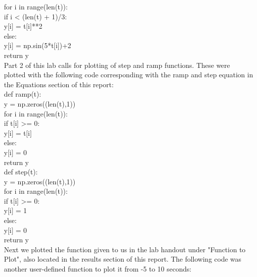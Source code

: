 \documentclass[12pt]{report}
\begin{document}
    \indent \indent for i in range(len(t)):\\
        \indent \indent \indent if i < (len(t) + 1)/3:\\ %
          \indent \indent  \indent \indent y[i] = t[i]**2\\
       \indent \indent \indent else:\\
           \indent \indent \indent \indent y[i] = np.sin(5*t[i])+2\\
    \indent \indent return y \\
    

\noindent Part 2 of this lab calls for plotting of step and ramp functions. These were plotted with the following code corresponding with the ramp and step equation in the Equations section of this report: \\

\indent def ramp(t):\\
    \indent \indent y = np.zeros((len(t),1))\\
    
    \indent \indent for i in range(len(t)):\\
        \indent \indent \indent if t[i] >= 0:\\
            \indent \indent \indent \indent y[i] = t[i]\\
        \indent \indent \indent else: \\
            \indent \indent \indent \indent y[i] = 0\\
    \indent \indent return y\\
    
\indent def step(t):\\
    \indent \indent y = np.zeros((len(t),1))\\
    
    \indent \indent for i in range(len(t)):\\
        \indent \indent \indent if t[i] >= 0:\\
            \indent \indent \indent \indent y[i] = 1\\
        \indent \indent \indent else:\\
            \indent \indent \indent \indent y[i] = 0\\
    \indent \indent return y\\

\noindent Next we plotted the function given to us in the lab handout under "Function to Plot", also located in the results section of this report. The following code was another user-defined function to plot it from -5 to 10 seconds:\\
\end{document}
